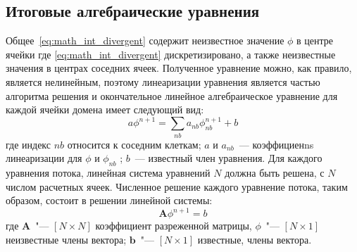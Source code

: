 \subsection{Итоговые алгебраические уравнения}

Общее~\cref{eq:math_int_divergent} содержит неизвестное значение \(\phi\) в центре ячейки где \cref{eq:math_int_divergent}
дискретизировано, а также неизвестные значения в центрах соседних ячеек.
Полученное уравнение можно, как правило, является нелинейным, поэтому линеаризации уравнения является частью алгоритма решения и окончательное линейное алгебраическое уравнение для каждой ячейки домена имеет следующий вид:
\begin{equation}
a{\phi }^{n+1}=\sum_{nb}{a}_{nb}{\phi }_{nb}^{n+1}+b
\end{equation}
где индекс \(nb\) относится к соседним клеткам; \(a\) и \(a_{nb}\)~--- коэффициенns линеаризации для \(\phi\) и \(\phi_{nb}\) ; \(b\)~--- известный член уравнения. 
Для каждого уравнения потока, линейная система уравнений \(N\) должна быть решена, с \(N\) числом расчетных ячеек.
Численное решение каждого уравнение потока, таким образом, состоит в решении линейной системы:
\begin{equation}
\boldsymbol A{\phi }^{n+1}=b
\end{equation}
где \(\boldsymbol A\)~"--- \([N\times N]\) коэффициент разреженной матрицы, \(\phi\)~"--- \([N\times 1]\) неизвестные члены вектора; \(\boldsymbol b\)~"--- \([N\times 1]\) известные, члены вектора. 
